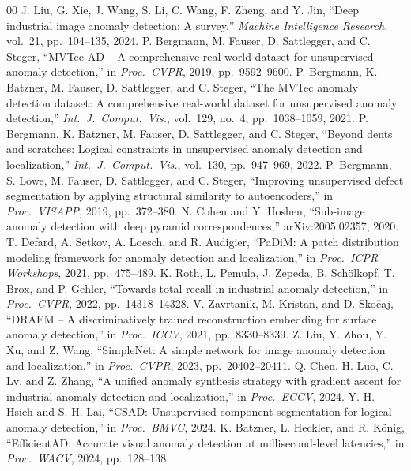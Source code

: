 \documentclass[conference]{IEEEtran}
\begin{document}
\begin{thebibliography}{00}
 J. Liu, G. Xie, J. Wang, S. Li, C. Wang, F. Zheng, and Y. Jin, ``Deep industrial image anomaly detection: A survey,'' \emph{Machine Intelligence Research}, vol.~21, pp.~104--135, 2024.
 P. Bergmann, M. Fauser, D. Sattlegger, and C. Steger, ``MVTec AD -- A comprehensive real-world dataset for unsupervised anomaly detection,'' in \emph{Proc.\ CVPR}, 2019, pp.~9592--9600.
 P. Bergmann, K. Batzner, M. Fauser, D. Sattlegger, and C. Steger, ``The MVTec anomaly detection dataset: A comprehensive real-world dataset for unsupervised anomaly detection,'' \emph{Int.\ J.\ Comput.\ Vis.}, vol.~129, no.~4, pp.~1038--1059, 2021.
 P. Bergmann, K. Batzner, M. Fauser, D. Sattlegger, and C. Steger, ``Beyond dents and scratches: Logical constraints in unsupervised anomaly detection and localization,'' \emph{Int.\ J.\ Comput.\ Vis.}, vol.~130, pp.~947--969, 2022.
 P. Bergmann, S. L\"owe, M. Fauser, D. Sattlegger, and C. Steger, ``Improving unsupervised defect segmentation by applying structural similarity to autoencoders,'' in \emph{Proc.\ VISAPP}, 2019, pp.~372--380.
 N. Cohen and Y. Hoshen, ``Sub-image anomaly detection with deep pyramid correspondences,'' arXiv:2005.02357, 2020.
 T. Defard, A. Setkov, A. Loesch, and R. Audigier, ``PaDiM: A patch distribution modeling framework for anomaly detection and localization,'' in \emph{Proc.\ ICPR Workshops}, 2021, pp.~475--489.
 K. Roth, L. Pemula, J. Zepeda, B. Sch\"olkopf, T. Brox, and P. Gehler, ``Towards total recall in industrial anomaly detection,'' in \emph{Proc.\ CVPR}, 2022, pp.~14318--14328.
 V. Zavrtanik, M. Kristan, and D. Sko\v{c}aj, ``DRAEM -- A discriminatively trained reconstruction embedding for surface anomaly detection,'' in \emph{Proc.\ ICCV}, 2021, pp.~8330--8339.
 Z. Liu, Y. Zhou, Y. Xu, and Z. Wang, ``SimpleNet: A simple network for image anomaly detection and localization,'' in \emph{Proc.\ CVPR}, 2023, pp.~20402--20411.
 Q. Chen, H. Luo, C. Lv, and Z. Zhang, ``A unified anomaly synthesis strategy with gradient ascent for industrial anomaly detection and localization,'' in \emph{Proc.\ ECCV}, 2024.
 Y.-H. Hsieh and S.-H. Lai, ``CSAD: Unsupervised component segmentation for logical anomaly detection,'' in \emph{Proc.\ BMVC}, 2024.
 K. Batzner, L. Heckler, and R. K\"onig, ``EfficientAD: Accurate visual anomaly detection at millisecond-level latencies,'' in \emph{Proc.\ WACV}, 2024, pp.~128--138.

\end{thebibliography}
\end{document}
